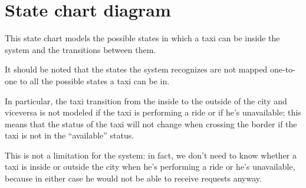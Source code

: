 \begin{landscape}
%
\end{landscape}


\section{State chart diagram}
This state chart models the possible states in which a taxi can be inside the system and the transitions between them.

It should be noted that the states the system recognizes are not mapped one-to-one to all the possible states a taxi can be in. 

In particular, the taxi transition from the inside to the outside of the city and viceversa is not modeled if the taxi is performing a ride or if he's unavailable; this means that the status of the taxi will not change when crossing the border if the taxi is not in the ``available'' status. 

This is not a limitation for the system: in fact, we don't need to know whether a taxi is inside or outside the city when he's performing a ride or he's unavailable, because in either case he would not be able to receive requests anyway.

\begin{figure}[H]
\centering
{}
\end{figure}
\pagebreak

